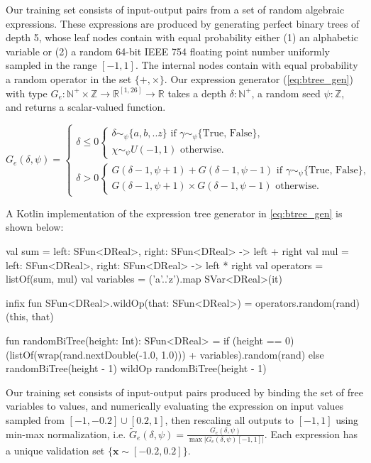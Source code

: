  Our training set consists of input-output pairs from a set of random algebraic expressions. These expressions are produced by generating perfect binary trees of depth 5, whose leaf nodes contain with equal probability either (1) an alphabetic variable or (2) a random 64-bit IEEE 754 floating point number uniformly sampled in the range $[-1, 1]$. The internal nodes contain with equal probability a random operator in the set $\{+, \times\}$. Our expression generator (\autoref{eq:btree_gen}) with type $G_e: \mathbb{N}^+\times\mathbb{Z} \rightarrow \mathbb{R}^{[1, 26]} \rightarrow \mathbb{R}$ takes a depth $\delta: \mathbb{N}^+$, a random seed $\psi: \mathbb{Z}$, and returns a scalar-valued function.

\begin{equation}\label{eq:btree_gen}
G_e(\delta, \psi) = \begin{cases}
    \delta \leq 0 \begin{cases}
    \delta\sim_\psi\{a,b,..z\} \text{ if } \gamma\sim_\psi\{\text{True, False}\},\\
    \chi\sim_\psi U(-1, 1) \text{ otherwise.}
    \end{cases} \\
    \delta > 0 \begin{cases}
    G(\delta-1, \psi + 1) + G(\delta-1, \psi - 1) \text{ if } \gamma\sim_\psi\{\text{True, False}\},\\
    G(\delta-1, \psi + 1) \times G(\delta-1, \psi - 1) \text{ otherwise.}
    \end{cases}
\end{cases}
\end{equation}

A Kotlin implementation of the expression tree generator in \autoref{eq:btree_gen} is shown below:
%
\begin{kotlinlisting}
val sum = { left: SFun<DReal>, right: SFun<DReal> -> left + right }
val mul = { left: SFun<DReal>, right: SFun<DReal> -> left * right }
val operators = listOf(sum, mul)
val variables = ('a'..'z').map { SVar<DReal>(it) }

infix fun SFun<DReal>.wildOp(that: SFun<DReal>) = operators.random(rand)(this, that)

fun randomBiTree(height: Int): SFun<DReal> =
  if (height == 0) (listOf(wrap(rand.nextDouble(-1.0, 1.0))) + variables).random(rand)
  else randomBiTree(height - 1) wildOp randomBiTree(height - 1)
\end{kotlinlisting}

Our training set consists of input-output pairs produced by binding the set of free variables to values, and numerically evaluating the expression on input values sampled from $[-1, -0.2] \cup [0.2, 1]$, then rescaling all outputs to $[-1, 1]$ using min-max normalization, i.e. $\tilde{G}_e(\delta, \psi)= \frac{G_e(\delta, \psi)}{\max |G_e(\delta, \psi)[-1, 1]|}$. Each expression has a unique validation set $\{\mathbf x \sim [-0.2, 0.2]\}$.

